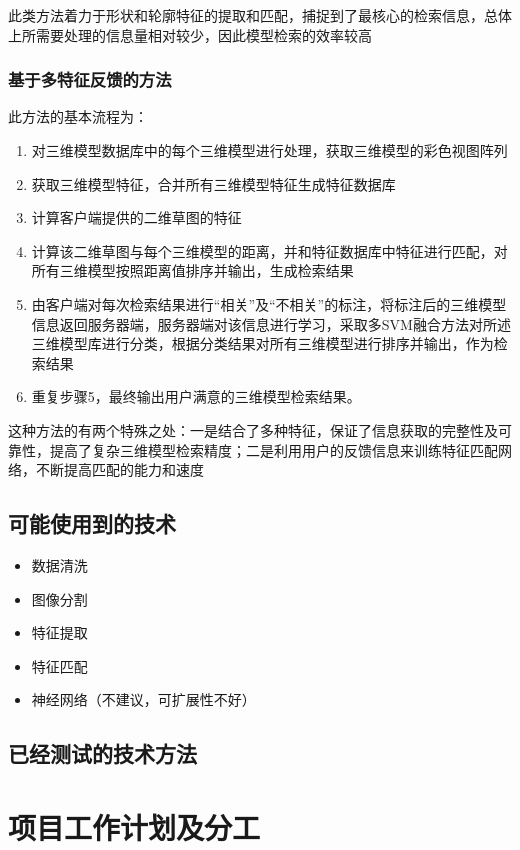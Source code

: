 \documentclass{article}
\begin{document}
此类方法着力于形状和轮廓特征的提取和匹配，捕捉到了最核心的检索信息，总体上所需要处理的信息量相对较少，因此模型检索的效率较高
\subsubsection{基于多特征反馈的方法}
此方法的基本流程为：
\begin{enumerate}
    \item 对三维模型数据库中的每个三维模型进行处理，获取三维模型的彩色视图阵列
    \item 获取三维模型特征，合并所有三维模型特征生成特征数据库
    \item 计算客户端提供的二维草图的特征
    \item 计算该二维草图与每个三维模型的距离，并和特征数据库中特征进行匹配，对所有三维模型按照距离值排序并输出，生成检索结果
    \item 由客户端对每次检索结果进行“相关”及“不相关”的标注，将标注后的三维模型信息返回服务器端，服务器端对该信息进行学习，采取多SVM融合方法对所述三维模型库进行分类，根据分类结果对所有三维模型进行排序并输出，作为检索结果
    \item 重复步骤5，最终输出用户满意的三维模型检索结果。
\end{enumerate}

这种方法的有两个特殊之处：一是结合了多种特征，保证了信息获取的完整性及可靠性，提高了复杂三维模型检索精度；二是利用用户的反馈信息来训练特征匹配网络，不断提高匹配的能力和速度
\subsection{可能使用到的技术}
\begin{itemize}
    \item 数据清洗
    \item 图像分割
    \item 特征提取
    \item 特征匹配
    \item 神经网络（不建议，可扩展性不好）
\end{itemize}
\subsection{已经测试的技术方法}

\section{项目工作计划及分工}
\end{document}
